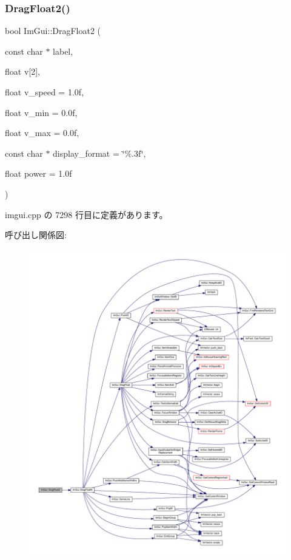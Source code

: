 \subsubsection{\texorpdfstring{Drag\+Float2()}{DragFloat2()}}
{\footnotesize\ttfamily bool Im\+Gui\+::\+Drag\+Float2 (\begin{DoxyParamCaption}\item[{const char $\ast$}]{label,  }\item[{float}]{v\mbox{[}2\mbox{]},  }\item[{float}]{v\+\_\+speed = {\ttfamily 1.0f},  }\item[{float}]{v\+\_\+min = {\ttfamily 0.0f},  }\item[{float}]{v\+\_\+max = {\ttfamily 0.0f},  }\item[{const char $\ast$}]{display\+\_\+format = {\ttfamily \char`\"{}\%.3f\char`\"{}},  }\item[{float}]{power = {\ttfamily 1.0f} }\end{DoxyParamCaption})}



 imgui.\+cpp の 7298 行目に定義があります。

呼び出し関係図\+:\nopagebreak
\begin{figure}[H]
\begin{center}
\leavevmode
\includegraphics[width=350pt]{namespace_im_gui_a2852e4c3b872ed5a5d28047f0290f29c_cgraph}
\end{center}
\end{figure}
\mbox{\label{namespace_im_gui_a3a365703646c6fb5357f21a13c531bfe}} 
